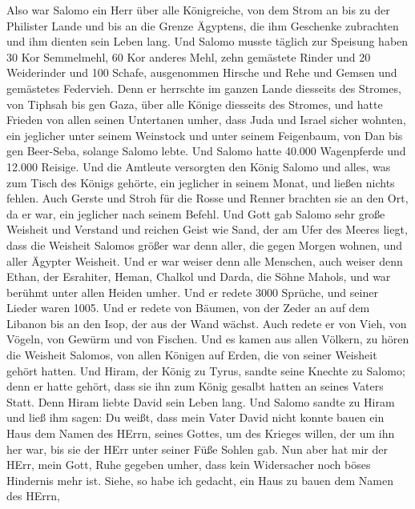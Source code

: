  Also war Salomo ein Herr über alle Königreiche, von dem
Strom an bis zu der Philister Lande und bis an die Grenze Ägyptens, die
ihm Geschenke zubrachten und ihm dienten sein Leben lang. 
Und Salomo musste täglich zur Speisung haben 30 Kor Semmelmehl, 60 Kor
anderes Mehl,  zehn gemästete Rinder und 20 Weiderinder und
100 Schafe, ausgenommen Hirsche und Rehe und Gemsen und gemästetes
Federvieh.  Denn er herrschte im ganzen Lande diesseits des
Stromes, von Tiphsah bis gen Gaza, über alle Könige diesseits des
Stromes, und hatte Frieden von allen seinen Untertanen umher,
 dass Juda und Israel sicher wohnten, ein jeglicher unter
seinem Weinstock und unter seinem Feigenbaum, von Dan bis gen Beer-Seba,
solange Salomo lebte.  Und Salomo hatte 40.000 Wagenpferde
und 12.000 Reisige.  Und die Amtleute versorgten den König
Salomo und alles, was zum Tisch des Königs gehörte, ein jeglicher in
seinem Monat, und ließen nichts fehlen.  Auch Gerste und
Stroh für die Rosse und Renner brachten sie an den Ort, da er war, ein
jeglicher nach seinem Befehl.  Und Gott gab Salomo sehr
große Weisheit und Verstand und reichen Geist wie Sand, der am Ufer des
Meeres liegt,  dass die Weisheit Salomos größer war denn
aller, die gegen Morgen wohnen, und aller Ägypter Weisheit.
 Und er war weiser denn alle Menschen, auch weiser denn
Ethan, der Esrahiter, Heman, Chalkol und Darda, die Söhne Mahols, und
war berühmt unter allen Heiden umher.  Und er redete 3000
Sprüche, und seiner Lieder waren 1005.  Und er redete von
Bäumen, von der Zeder an auf dem Libanon bis an den Isop, der aus der
Wand wächst. Auch redete er von Vieh, von Vögeln, von Gewürm und von
Fischen.  Und es kamen aus allen Völkern, zu hören die
Weisheit Salomos, von allen Königen auf Erden, die von seiner Weisheit
gehört hatten.  Und Hiram, der König zu Tyrus, sandte seine
Knechte zu Salomo; denn er hatte gehört, dass sie ihn zum König gesalbt
hatten an seines Vaters Statt. Denn Hiram liebte David sein Leben lang.
 Und Salomo sandte zu Hiram und ließ ihm sagen:
 Du weißt, dass mein Vater David nicht konnte bauen ein
Haus dem Namen des HErrn, seines Gottes, um des Krieges willen, der um
ihn her war, bis sie der HErr unter seiner Füße Sohlen gab.
 Nun aber hat mir der HErr, mein Gott, Ruhe gegeben umher,
dass kein Widersacher noch böses Hindernis mehr ist. 
Siehe, so habe ich gedacht, ein Haus zu bauen dem Namen des HErrn,
